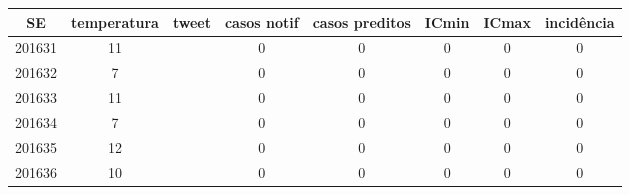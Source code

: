 \begin{tabular}{c|ccccccc}
  \hline
SE & temperatura & tweet & casos notif & casos preditos & ICmin & ICmax & incidência \\ 
  \hline
201631 & 11 &  & 0 & 0 & 0 & 0 & 0 \\ 
  201632 & 7 &  & 0 & 0 & 0 & 0 & 0 \\ 
  201633 & 11 &  & 0 & 0 & 0 & 0 & 0 \\ 
  201634 & 7 &  & 0 & 0 & 0 & 0 & 0 \\ 
  201635 & 12 &  & 0 & 0 & 0 & 0 & 0 \\ 
  201636 & 10 &  & 0 & 0 & 0 & 0 & 0 \\ 
   \hline
\end{tabular}
